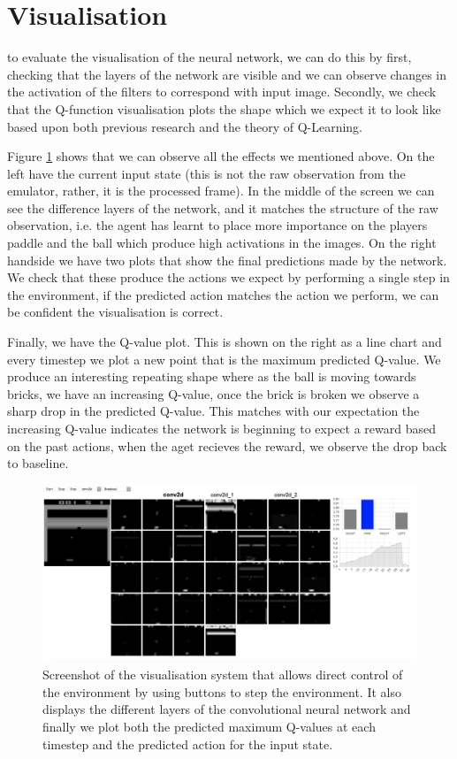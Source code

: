 \section{Visualisation}
to evaluate the visualisation of the neural network, we can do this by first, checking that the layers of the network are visible and we can observe changes in the activation of the filters to correspond with input image. Secondly, we check that the Q-function visualisation plots the shape which we expect it to look like based upon both previous research and the theory of Q-Learning.

Figure \ref{fig:vis_system_screenshot} shows that we can observe all the effects we mentioned above. On the left have the current input state (this is not the raw observation from the emulator, rather, it is the processed frame). In the middle of the screen we can see the difference layers of the network, and it matches the structure of the raw observation, i.e. the agent has learnt to place more importance on the players paddle and the ball which produce high activations in the images. On the right handside we have two plots that show the final predictions made by the network. We check that these produce the actions we expect by performing a single step in the environment, if the predicted action matches the action we perform, we can be confident the visualisation is correct.

Finally, we have the Q-value plot. This is shown on the right as a line chart and every timestep we plot a new point that is the maximum predicted Q-value. We produce an interesting repeating shape where as the ball is moving towards bricks, we have an increasing Q-value, once the brick is broken we observe a sharp drop in the predicted Q-value. This matches with our expectation the increasing Q-value indicates the network is beginning to expect a reward based on the past actions, when the aget recieves the reward, we observe the drop back to baseline.

\begin{figure}[htbp]
	\centering
	\includegraphics[width=1.0\textwidth]{chapters/chapter5/images/vis_screen.png}
	\caption[Screenshot of visualisation system]{Screenshot of the visualisation system that allows direct control of the environment by using buttons to step the environment. It also displays the different layers of the convolutional neural network and finally we plot both the predicted maximum Q-values at each timestep and the predicted action for the input state.
		\label{fig:vis_system_screenshot}
	}
\end{figure}